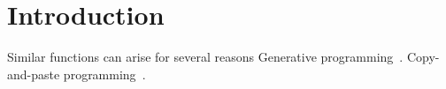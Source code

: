 
\chapter{Introduction}

Similar functions can arise for several reasons
Generative programming~\cite{czarnecki99,draheim04}.
Copy-and-paste programming~\cite{kim04,jablonski10,ahmed15}.
